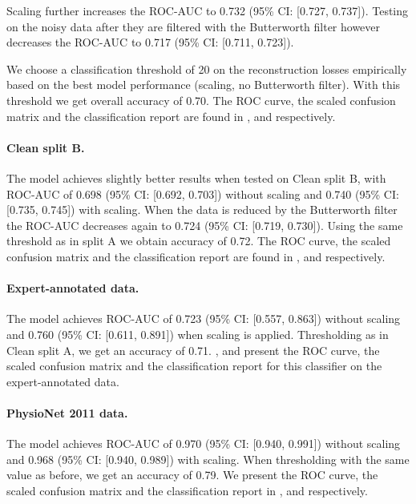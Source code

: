 \documentclass[a4paper,10pt]{article}
\begin{document}
Scaling further increases the ROC-AUC to 0.732 (95\% CI: [0.727, 0.737]). Testing on the noisy data after they are filtered with the Butterworth filter however decreases the ROC-AUC to 0.717 (95\% CI: [0.711, 0.723]).

We choose a classification threshold of 20 on the reconstruction losses empirically based on the best model performance (scaling, no Butterworth filter). With this threshold we get overall accuracy of 0.70. The ROC curve, the scaled confusion matrix and the classification report are found in ,  and  respectively.

\paragraph{Clean split B.} The model achieves slightly better results when tested on Clean split B, with ROC-AUC of 0.698 (95\% CI: [0.692, 0.703]) without scaling and 0.740 (95\% CI: [0.735, 0.745]) with scaling. When the data is reduced by the Butterworth filter the ROC-AUC decreases again to 0.724 (95\% CI: [0.719, 0.730]). Using the same threshold as in split A we obtain accuracy of 0.72. The ROC curve, the scaled confusion matrix and the classification report are found in ,  and  respectively.

\paragraph{Expert-annotated data.} The model achieves ROC-AUC of 0.723 (95\% CI: [0.557, 0.863]) without scaling and 0.760 (95\% CI: [0.611, 0.891]) when scaling is applied. Thresholding as in Clean split A, we get an accuracy of 0.71. ,  and  present the ROC curve, the scaled confusion matrix and the classification report for this classifier on the expert-annotated data.

\paragraph{PhysioNet 2011 data.} The model achieves ROC-AUC of 0.970 (95\% CI: [0.940, 0.991]) without scaling and 0.968 (95\% CI: [0.940, 0.989]) with scaling. When thresholding with the same value as before, we get an accuracy of 0.79. We present the ROC curve, the scaled confusion matrix and the classification report in ,  and  respectively.
\end{document}
